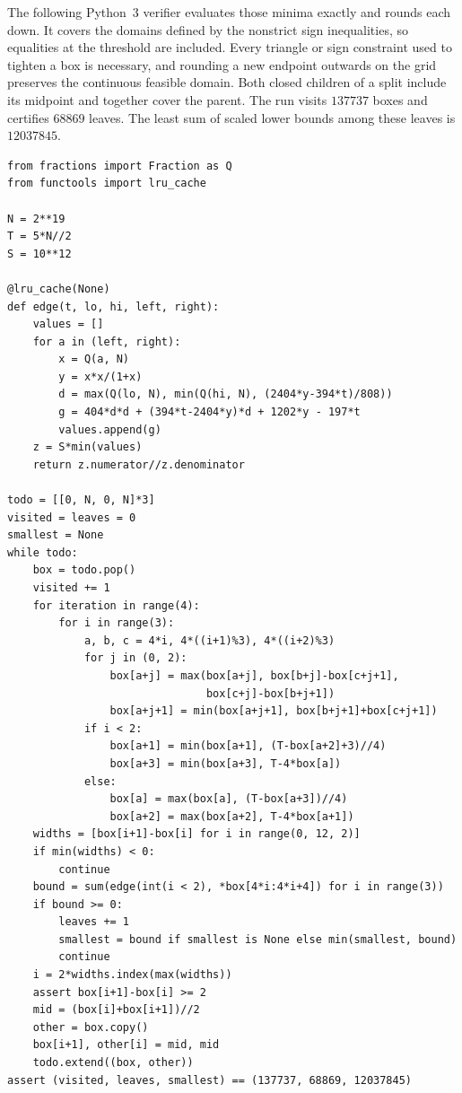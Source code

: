 \documentclass[11pt]{article}
\begin{document}
The following Python~3 verifier evaluates those minima exactly and
rounds each down. It covers the domains defined by the nonstrict sign inequalities, so equalities
at the threshold are included. Every triangle or sign constraint
used to tighten a box is necessary, and rounding a new endpoint
outwards on the grid preserves the continuous feasible domain. Both
closed children of a split include its midpoint and together cover
the parent. The run visits $137737$ boxes and certifies $68869$ leaves.
The least sum of scaled lower bounds among these leaves is $12037845$.
\begin{Verbatim}[fontsize=\scriptsize]
from fractions import Fraction as Q
from functools import lru_cache

N = 2**19
T = 5*N//2
S = 10**12

@lru_cache(None)
def edge(t, lo, hi, left, right):
    values = []
    for a in (left, right):
        x = Q(a, N)
        y = x*x/(1+x)
        d = max(Q(lo, N), min(Q(hi, N), (2404*y-394*t)/808))
        g = 404*d*d + (394*t-2404*y)*d + 1202*y - 197*t
        values.append(g)
    z = S*min(values)
    return z.numerator//z.denominator

todo = [[0, N, 0, N]*3]
visited = leaves = 0
smallest = None
while todo:
    box = todo.pop()
    visited += 1
    for iteration in range(4):
        for i in range(3):
            a, b, c = 4*i, 4*((i+1)%3), 4*((i+2)%3)
            for j in (0, 2):
                box[a+j] = max(box[a+j], box[b+j]-box[c+j+1],
                               box[c+j]-box[b+j+1])
                box[a+j+1] = min(box[a+j+1], box[b+j+1]+box[c+j+1])
            if i < 2:
                box[a+1] = min(box[a+1], (T-box[a+2]+3)//4)
                box[a+3] = min(box[a+3], T-4*box[a])
            else:
                box[a] = max(box[a], (T-box[a+3])//4)
                box[a+2] = max(box[a+2], T-4*box[a+1])
    widths = [box[i+1]-box[i] for i in range(0, 12, 2)]
    if min(widths) < 0:
        continue
    bound = sum(edge(int(i < 2), *box[4*i:4*i+4]) for i in range(3))
    if bound >= 0:
        leaves += 1
        smallest = bound if smallest is None else min(smallest, bound)
        continue
    i = 2*widths.index(max(widths))
    assert box[i+1]-box[i] >= 2
    mid = (box[i]+box[i+1])//2
    other = box.copy()
    box[i+1], other[i] = mid, mid
    todo.extend((box, other))
assert (visited, leaves, smallest) == (137737, 68869, 12037845)
\end{Verbatim}
\end{document}
